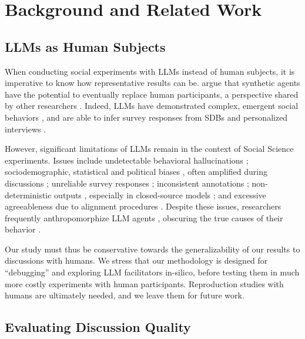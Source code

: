 %
\section{Background and Related Work}

\subsection{LLMs as Human Subjects}
\label{ssec:related:human-llm}

When conducting social experiments with \acp{LLM} instead of human subjects, it is imperative to know how representative results can be. \citet{grossman_2023} argue that synthetic agents have the potential to eventually replace human participants, a perspective shared by other researchers \cite{tornberg_2023, argyle2023}. Indeed, \acp{LLM} have demonstrated complex, emergent social behaviors \cite{Park2023GenerativeAI, demarzo_2023, leng_2024, abdelnabi_negotiations, abramski_2023}, and are able to infer survey responses from \acp{SDB} \cite{hewitt2024predicting} and personalized interviews \cite{park2024generativeagentsimulations1000}.

However, significant limitations of \acp{LLM} remain in the context of Social Science experiments. Issues include undetectable behavioral hallucinations \cite{rossi_2024}; sociodemographic, statistical and political biases \cite{anthis_2025,hewitt2024predicting,rossi_2024}, often amplified during discussions \cite{Taubenfeld2024SystematicBI}; unreliable survey responses \cite{jansen_2023,bisbee_2023,neumann_2025}; inconsistent annotations \cite{Gligoric2024CanUL}; non-deterministic outputs \cite{atil_2025}, especially in closed-source models \cite{bisbee_2023}; and excessive agreeableness due to alignment procedures \cite{Park2023GenerativeAI, anthis_2025, rossi_2024}. Despite these issues, researchers frequently anthropomorphize \ac{LLM} agents \cite{rossi_2024}, obscuring the true causes of their behavior \cite{anthis_2025,zhou-etal-2024-real}. 

Our study must thus be conservative towards the generalizability of our results to discussions with humans. We stress that our methodology is designed for “debugging” and exploring \ac{LLM} facilitators in-silico, before testing them in much more costly experiments with human participants. Reproduction studies with humans are ultimately needed, and we leave them for future work.


\subsection{Evaluating Discussion Quality}
\label{ssec:related:quality}

